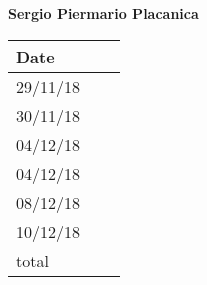 \documentclass[../main.tex]{subfiles}
\begin{document}
\vspace{1cm}

\newpage

\begin{center}
	{\bf Sergio Piermario Placanica}
	\vspace{2mm}

		\begin{tabular}{p{1.3cm}|p{1.8cm}|p{6.7cm}}
			\hline
			\bf Date & \bf \makebox[1.8cm][c]{Hours} & \bf \makebox[6.7cm][c]{Description} \\
			\hline
			29/11/18 & \makebox[1.8cm][c]{2h} & \makebox[6.7cm][c]{Architechtural Design}\\
			30/11/18 & \makebox[1.8cm][c]{1h} & \makebox[6.7cm][c]{Architectural Design}\\
			04/12/18 & \makebox[1.8cm][c]{2h} & \makebox[6.7cm][c]{Reviewing}\\
			04/12/18 & \makebox[1.8cm][c]{3h} & \makebox[6.7cm][c]{Implementation and Testing}\\
			08/12/18 & \makebox[1.8cm][c]{3h} & \makebox[6.7cm][c]{UX diagram}\\
			10/12/18 & \makebox[1.8cm][c]{3h} & \makebox[6.7cm][c]{Reviewing}\\ 
			total    & \makebox[1.8cm][c]{14h}
		\end{tabular}
	\end{center}
\end{document}
